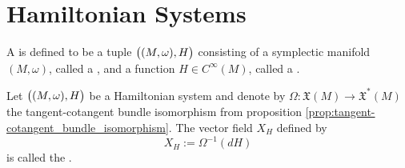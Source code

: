 \section*{Hamiltonian Systems}

\begin{definition}
	A  is defined to be a tuple $\del[1]{(M,\omega),H}$ consisting of a symplectic manifold $(M,\omega)$, called a , and a function $H \in C^\infty(M)$, called a .
\end{definition}

\begin{definition}
	Let $\del[1]{(M,\omega),H}$ be a Hamiltonian system and denote by $\Omega : \mathfrak{X}(M) \to \mathfrak{X}^*(M)$ the tangent-cotangent bundle isomorphism from proposition \textup{\ref{prop:tangent-cotangent_bundle_isomorphism}}. The vector field $X_H$ defined by
	\begin{equation*}
		X_H := \Omega^{-1}(dH)
	\end{equation*}
	\noindent is called the .
\end{definition}
